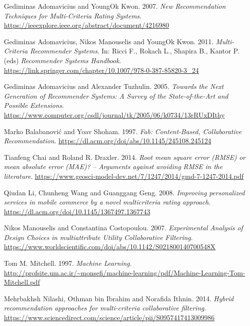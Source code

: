 \documentclass[sigconf,authordraft]{acmart}
\begin{document}
\begin{enumerate}[label={[\arabic*]}]
    \item
    Gediminas Adomavicius and YoungOk Kwon. 2007. \textit{New Recommendation Techniques for Multi-Criteria Rating Systems}. \url{https://ieeexplore.ieee.org/abstract/document/4216980}
    
    \item
    Gediminas Adomavicius, Nikos Manouselis and YoungOk Kwon. 2011. \textit{Multi-Criteria Recommender Systems}. In: Ricci F., Rokach L., Shapira B., Kantor P. (eds) \textit{Recommender Systems Handbook}. \url{https://link.springer.com/chapter/10.1007/978-0-387-85820-3_24}
    
    \item
    Gediminas Adomavicius and Alexander Tuzhulin. 2005. \textit{Towards the Next Generation of Recommender Systems:  A Survey of the State-of-the-Art and Possible Extensions}. \url{https://www.computer.org/csdl/journal/tk/2005/06/k0734/13rRUxDIthy}
    
    \item
    Marko Balabanović and Yoav Shoham. 1997. \textit{Fab: Content-Based, Collaborative Recommendation}. \url{https://dl.acm.org/doi/abs/10.1145/245108.245124}
    
    \item
    Tianfeng Chai and Roland R. Draxler. 2014. \textit{Root mean square error (RMSE) or mean absolute error (MAE)? – Arguments against avoiding RMSE in the literature}. \url{https://www.geosci-model-dev.net/7/1247/2014/gmd-7-1247-2014.pdf}
    
    \item
    Qiudan Li, Chunheng Wang and Guanggang Geng. 2008. \textit{Improving personalized services in mobile commerce by a novel multicriteria rating approach}. \url{https://dl.acm.org/doi/10.1145/1367497.1367743}
    
    \item
    Nikos Manouselis and Constantina Costopoulou. 2007. \textit{Experimental Analysis of Design Choices in multiattribute Utility Collaborative Filtering}. \url{https://www.worldscientific.com/doi/abs/10.1142/S021800140700548X}
    
    \item
    Tom M. Mitchell. 1997. \textit{Machine Learning}. \url{http://profsite.um.ac.ir/~monsefi/machine-learning/pdf/Machine-Learning-Tom-Mitchell.pdf}
    
    \item
    Mehrbakhsh Nilashi, Othman bin Ibrahim and Norafida Ithnin. 2014. \textit{Hybrid recommendation approaches for multi-criteria collaborative filtering}. \url{https://www.sciencedirect.com/science/article/pii/S0957417413009986}
    

\end{enumerate}
\end{document}
